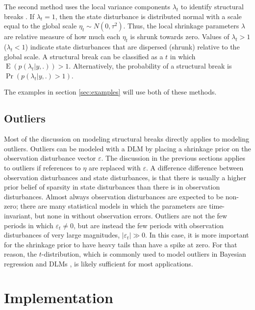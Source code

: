 \documentclass{article}
\DeclareMathOperator{\E}{E}
\begin{document}
The second method uses the local variance components $\lambda_{t}$ to identify structural breaks \parencite[179-180]{PetrisPetroneEtAl2009}.
If $\lambda_{t} = 1$, then the state disturbance is distributed normal with a scale equal to the global scale $\eta_{t} \sim N(0, \tau^{2})$.
Thus, the local shrinkage parameters $\lambda$ are relative measure of how much each $\eta_{t}$ is shrunk towards zero.
Values of $\lambda_{t} > 1$ ($\lambda_{t} < 1$) indicate state disturbances that are dispersed (shrunk) relative to the global scale.
A structural break can be classified as a $t$ in which $\E (p(\lambda_{t} | y, .)) > 1$.
Alternatively, the probability of a structural break is $\Pr(p(\lambda_{t} | y, .) > 1)$.

The examples in section \ref{sec:examples} will use both of these methods.

\subsection{Outliers}
\label{sec:outliers}

Most of the discussion on modeling structural breaks directly applies to modeling outliers.
Outliers can be modeled with a DLM by placing a shrinkage prior on the observation disturbance vector $\varepsilon$. 
The discussion in the previous sections applies to outliers if references to $\eta$ are replaced with $\varepsilon$.
A difference difference between observation disturbances and state disturbances, is that there is usually a higher prior belief of sparsity in state disturbances than there is in observation disturbances.
Almost always observation disturbances are expected to be non-zero;
there are many statistical models in which the parameters are time-invariant, but none in without observation errors.%
Outliers are not the few periods in which $\varepsilon_{t} \neq 0$, but are instead the few periods with observation disturbances of very large magnitudes, $|\varepsilon_{t}| \gg 0$.
In this case, it is more important for the shrinkage prior to have heavy tails than have a spike at zero. 
For that reason, the $t$-distribution, which is commonly used to model outliers in Bayesian regression and DLMs \parencite{West1984}, is likely sufficient for most applications.

\section{Implementation}
\label{sec:implementation}
\end{document}
